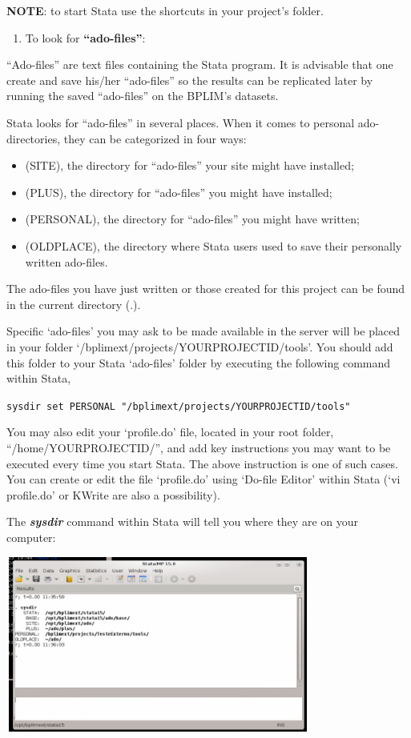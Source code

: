 \documentclass[
  11pt,
  a4paper,
]{article}
\providecommand{\tightlist}{%
  \setlength{\itemsep}{0pt}\setlength{\parskip}{0pt}}
\begin{document}
\textbf{NOTE}: to start Stata use the shortcuts in your project's
folder.

\begin{enumerate}
\def\labelenumi{\arabic{enumi}.}
\setcounter{enumi}{1}
\tightlist
\item
  To look for \textbf{``ado-files''}:
\end{enumerate}

``Ado-files'' are text files containing the Stata program. It is
advisable that one create and save his/her ``ado-files'' so the results
can be replicated later by running the saved ``ado-files'' on the
BPLIM's datasets.

Stata looks for ``ado-files'' in several places. When it comes to
personal ado-directories, they can be categorized in four ways:

\begin{itemize}
\item
  (SITE), the directory for ``ado-files'' your site might have
  installed;
\item
  (PLUS), the directory for ``ado-files'' you might have installed;
\item
  (PERSONAL), the directory for ``ado-files'' you might have written;
\item
  (OLDPLACE), the directory where Stata users used to save their
  personally written ado-files.
\end{itemize}

The ado-files you have just written or those created for this project
can be found in the current directory (.).

Specific `ado-files' you may ask to be made available in the server will
be placed in your folder `/bplimext/projects/YOURPROJECTID/tools'. You
should add this folder to your Stata `ado-files' folder by executing the
following command within Stata,

\texttt{sysdir\ set\ PERSONAL\ "/bplimext/projects/YOURPROJECTID/tools"}

You may also edit your `profile.do' file, located in your root folder,
``/home/YOURPROJECTID/'', and add key instructions you may want to be
executed every time you start Stata. The above instruction is one of
such cases. You can create or edit the file `profile.do' using `Do-file
Editor' within Stata (`vi profile.do' or KWrite are also a possibility).

The \textbf{\emph{sysdir}} command within Stata will tell you where they
are on your computer:

\includegraphics[width=3.93681in,height=2.27514in]{./media/image13.png}
\end{document}
